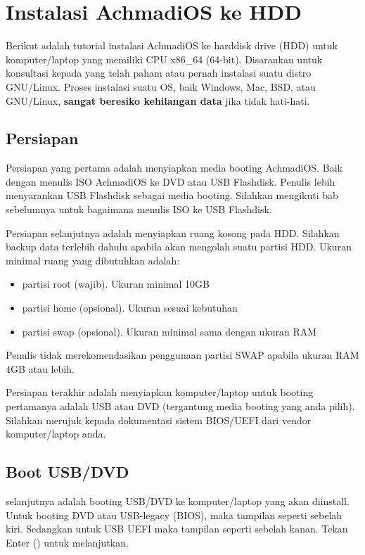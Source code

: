 \documentclass[12pt,]{article}
\begin{document}
	\newpage
	\section{Instalasi AchmadiOS ke HDD}
	
	Berikut adalah tutorial instalasi AchmadiOS ke harddisk drive (HDD) untuk komputer/laptop yang memiliki CPU x86\_64 (64-bit).
	Disarankan untuk konsultasi kepada yang telah paham atau pernah instalasi suatu distro GNU/Linux.
	Proses instalasi suatu OS, baik Windows, Mac, BSD, atau GNU/Linux, \textbf{sangat beresiko kehilangan data} jika tidak hati-hati.
	
	\subsection{Persiapan}
	Persiapan yang pertama adalah menyiapkan media booting AchmadiOS.
	Baik dengan menulis ISO AchmadiOS ke DVD atau USB Flashdisk.
	Penulis lebih menyarankan USB Flashdisk sebagai media booting.
	Silahkan mengikuti bab sebelumnya untuk bagaimana menulis ISO ke USB Flashdisk.
	
	Persiapan selanjutnya adalah menyiapkan ruang kosong pada HDD.
	Silahkan backup data terlebih dahulu apabila akan mengolah suatu partisi HDD.
	Ukuran minimal ruang yang dibutuhkan adalah:
	\begin{itemize}
		\item partisi root (wajib). Ukuran minimal 10GB
		\item partisi home (opsional). Ukuran sesuai kebutuhan
		\item partisi swap (opsional). Ukuran minimal sama dengan ukuran RAM
	\end{itemize}
	Penulis tidak merekomendasikan penggunaan partisi SWAP apabila ukuran RAM 4GB atau lebih.
	
	Persiapan terakhir adalah menyiapkan komputer/laptop untuk booting pertamanya adalah USB atau DVD (tergantung media booting yang anda pilih).
	Silahkan merujuk kepada dokumentasi sistem BIOS/UEFI dari vendor komputer/laptop anda. 
	
	\newpage
	\subsection{Boot USB/DVD}
	selanjutnya adalah booting USB/DVD ke komputer/laptop yang akan diinstall.
	Untuk booting DVD atau USB-legacy (BIOS), maka tampilan seperti sebelah kiri.
	Sedangkan untuk USB UEFI maka tampilan seperti sebelah kanan.
	Tekan Enter (\keys{\return}) untuk melanjutkan.
	
\end{document}
